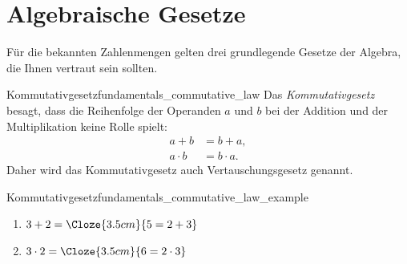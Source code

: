 \section{Algebraische Gesetze}
\label{sec:fundamentals_algebraic_laws}

Für die bekannten Zahlenmengen gelten drei grundlegende Gesetze der Algebra, die Ihnen vertraut sein sollten. \\

\noindent\begin{minipage}{\linewidth}
\begin{DefinitionBox}{Kommutativgesetz}{fundamentals_commutative_law}
  Das \emph{Kommutativgesetz}  besagt, dass die
  Reihenfolge der Operanden $a$ und $b$ bei der Addition und der Multiplikation
  keine Rolle spielt:
  \begin{align*}
    a+b &= b+a, \\
    a\cdot b &= b\cdot a.
  \end{align*}
  Daher wird das Kommutativgesetz auch Vertauschungsgesetz genannt.
\end{DefinitionBox}

\begin{ExampleBox}{Kommutativgesetz}{fundamentals_commutative_law_example}
  \begin{enumerate}[label=(\alph*),itemsep=0.6em]
    \item $3+2=\Cloze{3.5cm}{5=2+3}$
    \item $3\cdot 2=\Cloze{3.5cm}{6=2\cdot 3}$
  \end{enumerate}
\end{ExampleBox}
\end{minipage}

\vspace{1cm}

